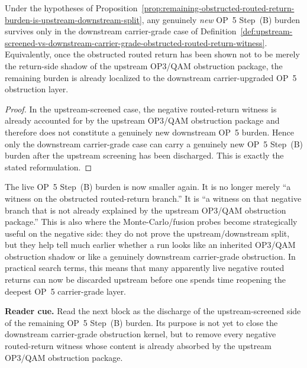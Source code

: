 \begin{corollary}
\label{cor:genuinely-new-op5b-burden-survives-only-on-downstream-branch}
Under the hypotheses of Proposition~\ref{prop:remaining-obstructed-routed-return-burden-is-upstream-downstream-split}, any genuinely \emph{new} OP~5 Step~(B) burden survives only in the downstream carrier-grade case of Definition~\ref{def:upstream-screened-vs-downstream-carrier-grade-obstructed-routed-return-witness}. Equivalently, once the obstructed routed return has been shown not to be merely the return-side shadow of the upstream OP3/QAM obstruction package, the remaining burden is already localized to the downstream carrier-upgraded OP~5 obstruction layer.
\end{corollary}

\begin{proof}
In the upstream-screened case, the negative routed-return witness is already accounted for by the upstream OP3/QAM obstruction package and therefore does not constitute a genuinely new downstream OP~5 burden. Hence only the downstream carrier-grade case can carry a genuinely new OP~5 Step~(B) burden after the upstream screening has been discharged. This is exactly the stated reformulation.
\end{proof}

\begin{remark}
\label{rem:what-third-op5b-sharpening-buys}
The live OP~5 Step~(B) burden is now smaller again. It is no longer merely ``a witness on the obstructed routed-return branch.'' It is ``a witness on that negative branch that is not already explained by the upstream OP3/QAM obstruction package.'' This is also where the Monte-Carlo/fusion probes become strategically useful on the negative side: they do not prove the upstream/downstream split, but they help tell much earlier whether a run looks like an inherited OP3/QAM obstruction shadow or like a genuinely downstream carrier-grade obstruction. In practical search terms, this means that many apparently live negative routed returns can now be discarded upstream before one spends time reopening the deepest OP~5 carrier-grade layer.
\end{remark}


\noindent\textbf{Reader cue.} Read the next block as the discharge of the upstream-screened side of the remaining OP~5 Step~(B) burden. Its purpose is not yet to close the downstream carrier-grade obstruction kernel, but to remove every negative routed-return witness whose content is already absorbed by the upstream OP3/QAM obstruction package.

